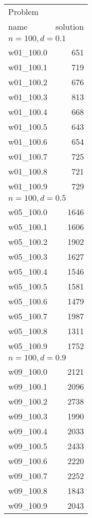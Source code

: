 \documentclass[a4paper, 12pt]{article}
\begin{document}
\begin{table} \begin{center}
\begin{minipage}{30ex}
\begin{tabular}{|l|r|}
\hline
Problem& \\
name & solution \\
\hline
\multicolumn{2}{|l|}{$n=100, d=0.1$}\\
\hline
w01\_100.0 & 651 \\
w01\_100.1 & 719 \\
w01\_100.2 & 676 \\
w01\_100.3 & 813 \\
w01\_100.4 & 668 \\
w01\_100.5 & 643 \\
w01\_100.6 & 654 \\
w01\_100.7 & 725 \\
w01\_100.8 & 721 \\
w01\_100.9 & 729 \\
\hline
\multicolumn{2}{|l|}{$n=100, d=0.5$}\\
\hline
w05\_100.0 & 1646 \\
w05\_100.1 & 1606 \\
w05\_100.2 & 1902 \\
w05\_100.3 & 1627 \\
w05\_100.4 & 1546 \\
w05\_100.5 & 1581 \\
w05\_100.6 & 1479 \\
w05\_100.7 & 1987 \\
w05\_100.8 & 1311 \\
w05\_100.9 & 1752 \\
\hline
\multicolumn{2}{|l|}{$n=100, d=0.9$}\\
\hline
w09\_100.0 & 2121 \\
w09\_100.1 & 2096 \\
w09\_100.2 & 2738 \\
w09\_100.3 & 1990 \\
w09\_100.4 & 2033 \\
w09\_100.5 & 2433 \\
w09\_100.6 & 2220 \\
w09\_100.7 & 2252 \\
w09\_100.8 & 1843 \\
w09\_100.9 & 2043 \\
\hline
\end{tabular}
\end{minipage}
\begin{minipage}{30ex}

\end{minipage}
\end{center}
\end{table}
\end{document}
